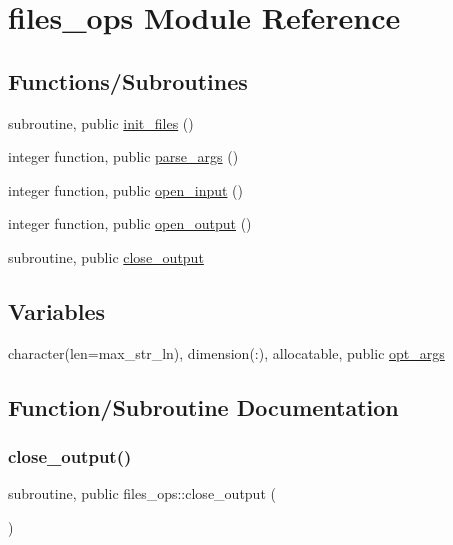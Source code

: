 \hypertarget{namespacefiles__ops}{}\section{files\+\_\+ops Module Reference}
\label{namespacefiles__ops}
\subsection*{Functions/\+Subroutines}
\begin{DoxyCompactItemize}
\item 
subroutine, public \hyperlink{namespacefiles__ops_a1e219b1147f109f758d03bef89d540e8}{init\+\_\+files} ()
\item 
integer function, public \hyperlink{namespacefiles__ops_a051584112f6e4f6e60b0ef824dffbf5e}{parse\+\_\+args} ()
\item 
integer function, public \hyperlink{namespacefiles__ops_a63a81a5a451f787025429878b2cec81b}{open\+\_\+input} ()
\item 
integer function, public \hyperlink{namespacefiles__ops_ad681a9e8083a6f664cf0f9d17ebe279c}{open\+\_\+output} ()
\item 
subroutine, public \hyperlink{namespacefiles__ops_a09c55ba39a79fd1e1d9d8af2e08f41cb}{close\+\_\+output}
\end{DoxyCompactItemize}
\subsection*{Variables}
\begin{DoxyCompactItemize}
\item 
character(len=max\+\_\+str\+\_\+ln), dimension(\+:), allocatable, public \hyperlink{namespacefiles__ops_a0666bcbf3aa6a9969e6dc563a40e7152}{opt\+\_\+args}
\end{DoxyCompactItemize}


\subsection{Function/\+Subroutine Documentation}
\mbox{\label{namespacefiles__ops_a09c55ba39a79fd1e1d9d8af2e08f41cb}} 
\subsubsection{\texorpdfstring{close\+\_\+output()}{close\_output()}}
{\footnotesize\ttfamily subroutine, public files\+\_\+ops\+::close\+\_\+output (\begin{DoxyParamCaption}{ }\end{DoxyParamCaption})}



